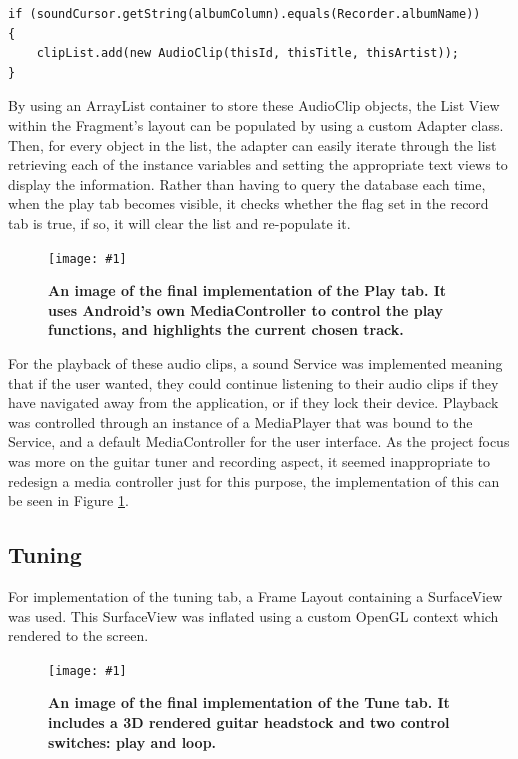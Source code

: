 \documentclass[conference]{acmsiggraph}
\newcommand{\figuremacroF}[3]{
	\begin{figure}[H] %
		\centering
		\texttt{[image: \#1]}
		\caption[#2]{\textbf{#2}}
		\label{fig:#1}
	\end{figure}
}
\begin{document}
\begin{lstlisting}[label = {lst:query}, caption={Conditional Statement for Creating Audio Clips}]
if (soundCursor.getString(albumColumn).equals(Recorder.albumName))
{
	clipList.add(new AudioClip(thisId, thisTitle, thisArtist));
}
\end{lstlisting}

By using an ArrayList container to store these AudioClip objects, the List View within the Fragment's layout can be populated by using a custom Adapter class. Then, for every object in the list, the adapter can easily iterate through the list retrieving each of the instance variables and setting the appropriate text views to display the information. Rather than having to query the database each time, when the play tab becomes visible, it checks whether the flag set in the record tab is true, if so, it will clear the list and re-populate it. 

\figuremacroF
{playback}
{An image of the final implementation of the Play tab. It uses Android's own MediaController to control the play functions, and highlights the current chosen track.}
{1.0}

For the playback of these audio clips, a sound Service was implemented meaning that if the user wanted, they could continue listening to their audio clips if they have navigated away from the application, or if they lock their device. Playback was controlled through an instance of a MediaPlayer that was bound to the Service, and a default MediaController for the user interface. As the project focus was more on the guitar tuner and recording aspect, it seemed inappropriate to redesign a media controller just for this purpose, the implementation of this can be seen in Figure \ref{fig:playback}.

\subsection{Tuning}

For implementation of the tuning tab, a Frame Layout containing a SurfaceView was used. This SurfaceView was inflated using a custom OpenGL context which rendered to the screen. \cite{OpenGL}

\figuremacroF
{tuner}
{An image of the final implementation of the Tune tab. It includes a 3D rendered guitar headstock and two control switches: play and loop.}
{1.0}
\end{document}
